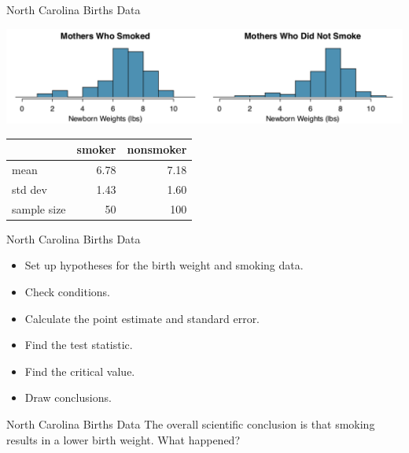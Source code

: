 \begin{frame}{North Carolina Births Data}
    \begin{center}
        \includegraphics[scale=0.3]{images/twogrp_brthwt.png}
    \end{center}
    
    \begin{table}[]
        \centering
        \begin{tabular}{lrr}
        \hline
                    & smoker & nonsmoker \\
        \hline
        mean        & 6.78 & 7.18 \\
        std dev     & 1.43 & 1.60 \\
        sample size & 50 & 100 \\
        \hline
        \end{tabular}
    \end{table}
\end{frame}

\begin{frame}{North Carolina Births Data}
    \begin{itemize}
        \item<1-> Set up hypotheses for the birth weight and smoking data.
        \item<2-> Check conditions.
        \item<3-> Calculate the point estimate and standard error.
        \item<4-> Find the test statistic.
        \item<5-> Find the critical value.
        \item<6-> Draw conclusions.
    \end{itemize}
\end{frame}

\begin{frame}{North Carolina Births Data}
    The overall scientific conclusion is that smoking results in a lower birth weight. What happened?
\end{frame}

